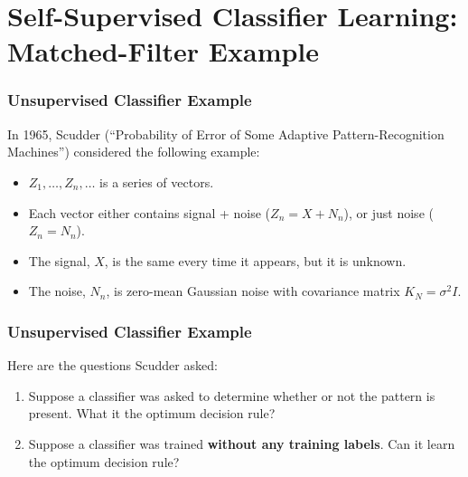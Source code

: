 \documentclass{beamer}
\begin{document}
\section[Self-Supervision]{Self-Supervised Classifier Learning: Matched-Filter Example}
\setcounter{subsection}{1}

\begin{frame}
  \frametitle{Unsupervised Classifier Example}

  In 1965, Scudder (``Probability of Error of Some Adaptive
  Pattern-Recognition Machines'') considered the following example:
  \begin{itemize}
  \item $Z_1,\ldots,Z_n,\ldots$ is a series of vectors.
  \item Each vector either contains signal + noise ($Z_n=X+N_n$),
    or just noise ($Z_n=N_n$).
  \item The signal, $X$, is the same every time it appears, but it is
    unknown.
  \item The noise, $N_n$, is zero-mean Gaussian noise with covariance
    matrix $K_N=\sigma^2I$.
  \end{itemize}
\end{frame}

\begin{frame}
  \frametitle{Unsupervised Classifier Example}

  Here are the questions Scudder asked:
  \begin{enumerate}
  \item Suppose a classifier was asked to determine whether or not the
    pattern is present.  What it the optimum decision rule?
  \item Suppose a classifier was trained {\bf without any training
    labels}.  Can it learn the optimum decision rule?
  \end{enumerate}
\end{frame}
\end{document}
